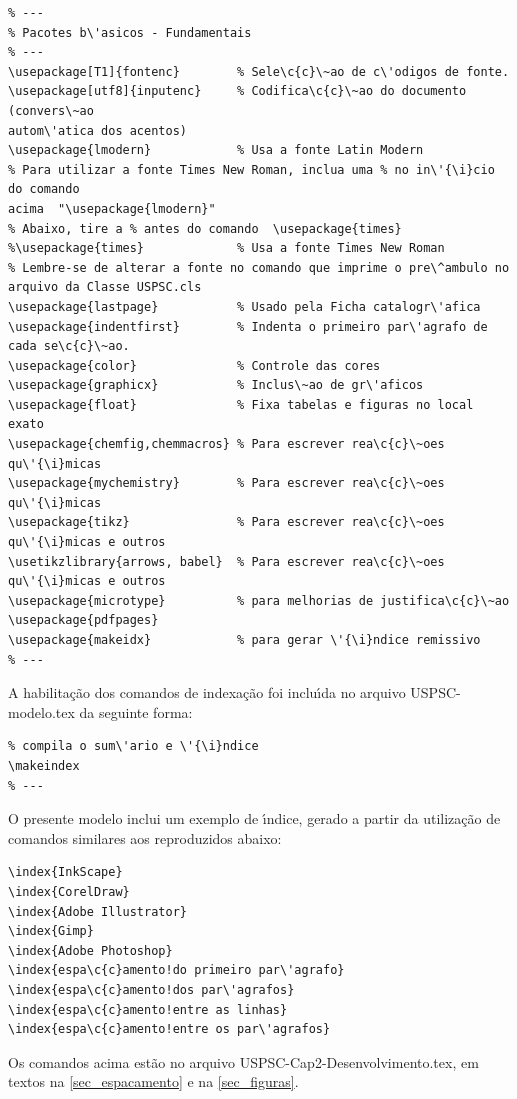\begin{verbatim}
% ---
% Pacotes b\'asicos - Fundamentais 
% ---
\usepackage[T1]{fontenc}		% Sele\c{c}\~ao de c\'odigos de fonte.
\usepackage[utf8]{inputenc}		% Codifica\c{c}\~ao do documento (convers\~ao 
autom\'atica dos acentos)
\usepackage{lmodern}			% Usa a fonte Latin Modern
% Para utilizar a fonte Times New Roman, inclua uma % no in\'{\i}cio do comando 
acima  "\usepackage{lmodern}"
% Abaixo, tire a % antes do comando  \usepackage{times}
%\usepackage{times}		    	% Usa a fonte Times New Roman	
% Lembre-se de alterar a fonte no comando que imprime o pre\^ambulo no 
arquivo da Classe USPSC.cls				
\usepackage{lastpage}			% Usado pela Ficha catalogr\'afica
\usepackage{indentfirst}		% Indenta o primeiro par\'agrafo de cada se\c{c}\~ao.
\usepackage{color}				% Controle das cores
\usepackage{graphicx}			% Inclus\~ao de gr\'aficos
\usepackage{float} 				% Fixa tabelas e figuras no local exato
\usepackage{chemfig,chemmacros} % Para escrever rea\c{c}\~oes qu\'{\i}micas
\usepackage{mychemistry}        % Para escrever rea\c{c}\~oes qu\'{\i}micas
\usepackage{tikz}				% Para escrever rea\c{c}\~oes qu\'{\i}micas e outros
\usetikzlibrary{arrows, babel}	% Para escrever rea\c{c}\~oes qu\'{\i}micas e outros
\usepackage{microtype} 			% para melhorias de justifica\c{c}\~ao
\usepackage{pdfpages}
\usepackage{makeidx}            % para gerar \'{\i}ndice remissivo
% ---
\end{verbatim}

A habilita\c{c}\~ao dos comandos de indexa\c{c}\~ao foi inclu\'{\i}da no arquivo USPSC-modelo.tex da seguinte forma:


\begin{verbatim}
% compila o sum\'ario e \'{\i}ndice
\makeindex
% ---
\end{verbatim}

O presente modelo inclui um exemplo de \'{\i}ndice, gerado a partir da utiliza\c{c}\~ao de comandos similares aos reproduzidos abaixo:

\begin{verbatim}
\index{InkScape}
\index{CorelDraw}
\index{Adobe Illustrator}
\index{Gimp}
\index{Adobe Photoshop}
\index{espa\c{c}amento!do primeiro par\'agrafo}
\index{espa\c{c}amento!dos par\'agrafos}
\index{espa\c{c}amento!entre as linhas}
\index{espa\c{c}amento!entre os par\'agrafos}
\end{verbatim}

Os comandos acima est\~ao no arquivo USPSC-Cap2-Desenvolvimento.tex, em textos na  \autoref{sec_espacamento}  e na  \autoref{sec_figuras}.

